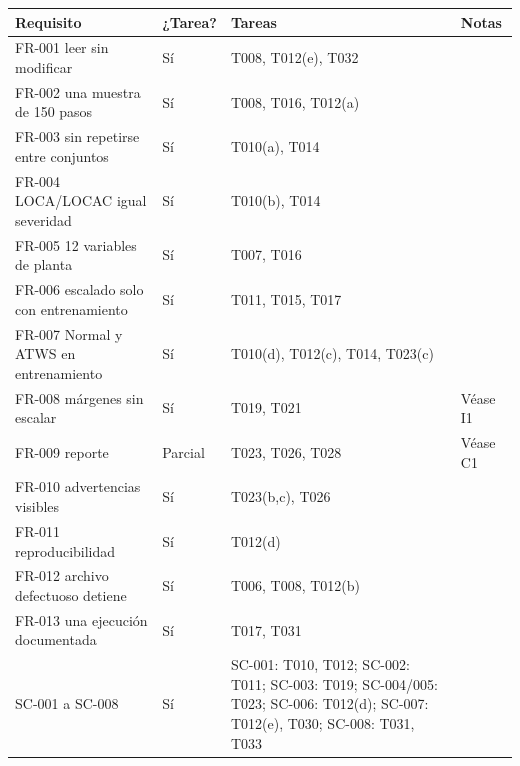 \documentclass[12pt,a4paper]{article}
\newcounter{none} %
\newenvironment{documentogenerado}[2]{%
  \def\doccomando{#1}\def\docruta{#2}%
  \par\begingroup\small\setstretch{1.15}\sloppy%
}{\endgroup\par\medskip}
\begin{document}
\begin{documentogenerado}{/speckit-analyze}{specs\slash 001-preparacion-datos\slash analisis-inicial.md}
{\def\LTcaptype{none} %
\begin{longtable}[]{@{}
  >{\raggedright\arraybackslash\hspace{0pt}}p{}
  >{\raggedright\arraybackslash\hspace{0pt}}p{}
  >{\raggedright\arraybackslash\hspace{0pt}}p{}
  >{\raggedright\arraybackslash\hspace{0pt}}p{}@{}}
\toprule\noalign{}
\begin{minipage}[b]{\linewidth}\raggedright
Requisito
\end{minipage} & \begin{minipage}[b]{\linewidth}\raggedright
¿Tarea?
\end{minipage} & \begin{minipage}[b]{\linewidth}\raggedright
Tareas
\end{minipage} & \begin{minipage}[b]{\linewidth}\raggedright
Notas
\end{minipage} \\
\midrule\noalign{}
\endhead
\bottomrule\noalign{}
\endlastfoot
FR-001 leer sin modificar & Sí & T008, T012(e), T032 & \\
FR-002 una muestra de 150 pasos & Sí & T008, T016, T012(a) & \\
FR-003 sin repetirse entre conjuntos & Sí & T010(a), T014 & \\
FR-004 LOCA/\hspace{0pt}LOCAC igual severidad & Sí & T010(b), T014 & \\
FR-005 12 variables de planta & Sí & T007, T016 & \\
FR-006 escalado solo con entrenamiento & Sí & T011, T015, T017 & \\
FR-007 Normal y ATWS en entrenamiento & Sí & T010(d), T012(c), T014, T023(c) & \\
FR-008 márgenes sin escalar & Sí & T019, T021 & Véase I1 \\
FR-009 reporte & Parcial & T023, T026, T028 & Véase C1 \\
FR-010 advertencias visibles & Sí & T023(b,c), T026 & \\
FR-011 reproducibilidad & Sí & T012(d) & \\
FR-012 archivo defectuoso detiene & Sí & T006, T008, T012(b) & \\
FR-013 una ejecución documentada & Sí & T017, T031 & \\
SC-001 a SC-008 & Sí & SC-001: T010, T012; SC-002: T011; SC-003: T019; SC-004/\hspace{0pt}005: T023; SC-006: T012(d); SC-007: T012(e), T030; SC-008: T031, T033 & \\
\end{longtable}
}


\end{documentogenerado}
\end{document}
